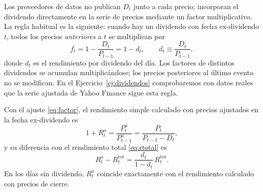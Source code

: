 Los proveedores de datos no publican $D_t$ junto a cada precio; incorporan el dividendo directamente
en la serie de precios mediante un factor multiplicativo. La regla habitual es la siguiente: cuando hay
un dividendo con fecha ex-dividendo $t$, todos los precios \emph{anteriores} a $t$ se multiplican por
\begin{equation}\label{eq:factor}
  f_t=1-\frac{D_t}{P_{t-1}}=1-d_t,\qquad d_t\equiv\frac{D_t}{P_{t-1}},
\end{equation}
donde $d_t$ es el rendimiento por dividendo del día. Los factores de distintos dividendos se acumulan
multiplicándose; los precios posteriores al último evento no se modifican. En el
Ejercicio~\ref{ej:dividendos} comprobaremos con datos reales que la serie ajustada de Yahoo Finance
sigue esta regla.

\begin{proposicion}\label{prop:ajuste}
Con el ajuste \eqref{eq:factor}, el rendimiento simple calculado con precios ajustados en la fecha
ex-dividendo es
\[
  1+R^{a}_t=\frac{P^{a}_t}{P^{a}_{t-1}}=\frac{P_t}{P_{t-1}-D_t},
\]
y su diferencia con el rendimiento total \eqref{eq:rtotal} es
\begin{equation}\label{eq:difajuste}
  R^{a}_t-R^{\mathrm{tot}}_t=\frac{d_t}{1-d_t}\,R^{\mathrm{tot}}_t .
\end{equation}
En los días sin dividendo, $R^{a}_t$ coincide exactamente con el rendimiento calculado con precios de
cierre.
\end{proposicion}

